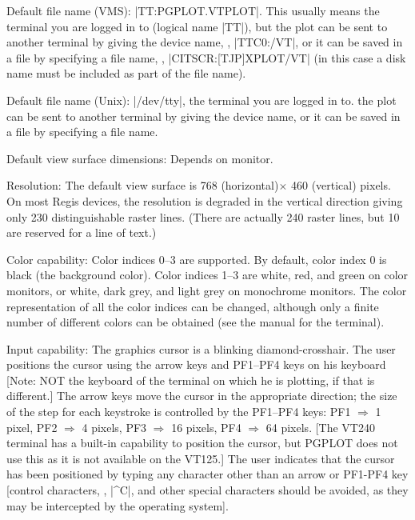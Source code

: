 \proclaim Default file name (VMS): |TT:PGPLOT.VTPLOT|. This usually means the
terminal you are logged in to (logical name |TT|), but the plot can be
sent to another terminal by giving the device name, \eg, |TTC0:/VT|, or
it can be saved in a file by specifying a file name, \eg, 
|CITSCR:[TJP]XPLOT/VT| (in this case a disk name must be included as 
part of the file name).

\proclaim Default file name (Unix): |/dev/tty|, the
terminal you are logged in to. the plot can be
sent to another terminal by giving the device name, or
it can be saved in a file by specifying a file name.

\proclaim Default view surface dimensions: Depends on monitor.

\proclaim Resolution: The default view surface is 768 (horizontal)$\times$
460 (vertical) pixels.  On most Regis devices, the resolution is 
degraded in the vertical direction giving only 230 distinguishable 
raster lines. (There are actually 240 raster lines, but 10 are reserved 
for a line of text.)

\proclaim Color capability:  Color indices 0--3 are supported.
By default, color index 0 is black (the background color). Color indices
1--3 are white, red, and green on color monitors, or white, dark grey, and
light grey on monochrome monitors.  The color representation of all 
the color indices can be changed, although only a finite number of 
different colors can be obtained (see the manual for the terminal).

\proclaim Input capability: The graphics cursor is a blinking
diamond-crosshair. The user positions the cursor using the arrow keys
and PF1--PF4 keys on his keyboard [Note: NOT the
keyboard of the terminal on which he is plotting, if that is different.]
The arrow keys move the cursor in the appropriate direction; the size of
the step for each keystroke is controlled by the PF1--PF4 keys: PF1
$\Rightarrow$ 1 pixel, PF2 $\Rightarrow$ 4 pixels, PF3 $\Rightarrow$ 16
pixels, PF4 $\Rightarrow$ 64 pixels. [The VT240 terminal has a built-in
capability to position the cursor, but PGPLOT does not use this as it is
not available on the VT125.] The user indicates that the cursor has
been positioned by typing any character other than an arrow or PF1-PF4
key [control characters, \eg, |^C|, and other special characters should
be avoided, as they may be intercepted by the operating system]. 

